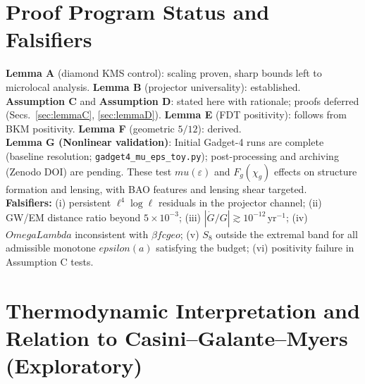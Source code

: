 \documentclass[aps,prd,onecolumn,superscriptaddress,nofootinbib]{revtex4-2}
\def\OmL{OmegaLambda}%
\def\cgeo{cgeo}%
\def\eps{epsilon}%
\def\mu{mu}%
\def\Omega_\Lambda{OmegaLambda}%
\providecommand{\OmL}{\Omega_\Lambda}
\providecommand{\cgeo}{c_{\rm geo}}
\providecommand{\eps}{\varepsilon}
\begin{document}
\section{Proof Program Status and Falsifiers}
\label{sec:program}
\textbf{Lemma A} (diamond KMS control): scaling proven, sharp bounds left to microlocal analysis. \textbf{Lemma B} (projector universality): established. \textbf{Assumption C} and \textbf{Assumption D}: stated here with rationale; proofs deferred (Secs.~\ref{sec:lemmaC}, \ref{sec:lemmaD}). \textbf{Lemma E} (FDT positivity): follows from BKM positivity. \textbf{Lemma F} (geometric \(5/12\)): derived.\\
\textbf{Lemma G (Nonlinear validation)}: Initial Gadget-4 runs are complete (baseline resolution; \texttt{gadget4\_mu\_eps\_toy.py}); post-processing and archiving (Zenodo DOI) are pending. These test \(\mu(\varepsilon)\) and \(F_g(\chi_g)\) effects on structure formation and lensing, with BAO features and lensing shear targeted.\\
\textbf{Falsifiers:} (i) persistent \(\ell^4\log\ell\) residuals in the projector channel; (ii) GW/EM distance ratio beyond \(5\times 10^{-3}\); (iii) \(|\dot G/G|\gtrsim 10^{-12}\,\mathrm{yr}^{-1}\); (iv) \(\OmL\) inconsistent with \(\beta f\cgeo\); (v) \(S_8\) outside the extremal band for all admissible monotone \(\eps(a)\) satisfying the budget; (vi) positivity failure in Assumption C tests.

\section{Thermodynamic Interpretation and Relation to Casini--Galante--Myers (Exploratory)}
\label{sec:thermo}
\end{document}
